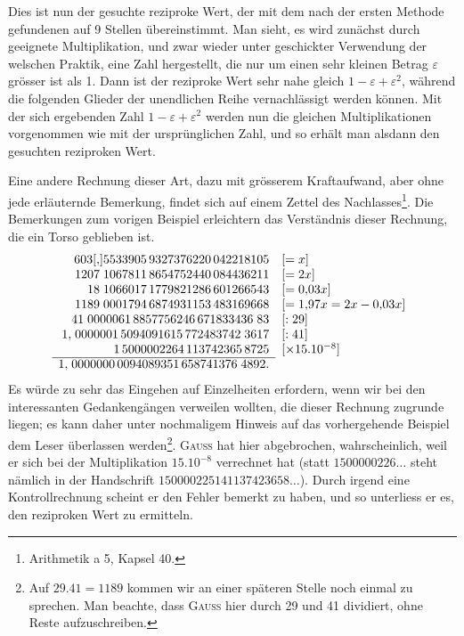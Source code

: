 \endgroup
\par\noindent\hspace*{\parindent}Dies ist nun der gesuchte reziproke Wert, der mit dem nach der ersten
Methode gefundenen auf 9 Stellen übereinstimmt. Man sieht, es wird zunächst durch geeignete Multiplikation, und zwar wieder unter geschickter Verwendung der welschen Praktik, eine Zahl hergestellt, die nur um einen sehr
kleinen Betrag $\varepsilon$ grösser ist als 1. Dann ist der reziproke Wert sehr nahe
gleich $1-\varepsilon+\varepsilon^2$, während die folgenden Glieder der unendlichen Reihe vernachlässigt werden können. Mit der sich ergebenden Zahl $1-\varepsilon+\varepsilon^2$ werden
nun die gleichen Multiplikationen vorgenommen wie mit der ursprünglichen
Zahl, und so erhält man alsdann den gesuchten reziproken Wert.

Eine andere Rechnung dieser Art, dazu mit grösserem Kraftaufwand,
aber ohne jede erläuternde Bemerkung, findet sich auf einem Zettel des
\clearpage{}
\setcounter{footnote}{0}
\noindent Nachlasses\footnote{Arithmetik a 5, Kapsel 40.}. Die Bemerkungen zum vorigen Beispiel erleichtern das Verständnis
dieser Rechnung, die ein Torso geblieben ist.
\begingroup\footnotesize\setlength{\arraycolsep}{2pt}
\[
\begin{array}{rl}
603[{,}]5533905\,9327376220\,042218105&[=x]\\
1207\;1067811\,8654752440\,084436211&[=2x]\\
18\;1066017\,1779821286\,601266543&[=0{,}03x]\\
1189\;0001794\,6874931153\,483169668&[=1{,}97x=2x-0{,}03x]\\
41\;0000061\,8857756246\,671833436\;83&[:29]\\
1{,}\;0000001\,5094091615\,772483742\;3617&[:41]\\
1\,5000002264\,113742365\,8725&[\times15\mathord{.}10^{-8}]\\\cline{1-1}
1{,}\;0000000\,0094089351\,658741376\;4892.&
\end{array}
\]
\endgroup
\noindent Es würde zu sehr das Eingehen auf Einzelheiten erfordern, wenn wir bei den
interessanten Gedankengängen verweilen wollten, die dieser Rechnung zugrunde
liegen; es kann daher unter nochmaligem Hinweis auf das vorhergehende
Beispiel dem Leser überlassen werden\footnote{Auf $29\mathord{.}41=1189$ kommen wir an einer späteren Stelle noch einmal zu sprechen. Man beachte, dass \textsc{Gauss} hier durch 29 und 41 dividiert, ohne Reste aufzuschreiben.}. \textsc{Gauss} hat hier abgebrochen, wahrscheinlich, weil er sich bei der Multiplikation $15\mathord{.}10^{-8}$ verrechnet hat (statt
$1500000226\ldots$ steht nämlich in der Handschrift $150000225141137423658\ldots$).
Durch irgend eine Kontrollrechnung scheint er den Fehler bemerkt zu haben,
und so unterliess er es, den reziproken Wert zu ermitteln.
\clearpage\endgroup
